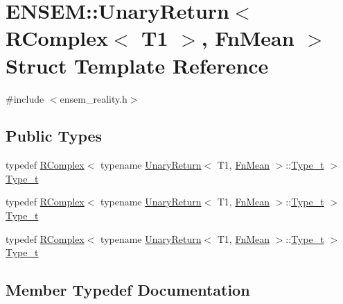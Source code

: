 \hypertarget{structENSEM_1_1UnaryReturn_3_01RComplex_3_01T1_01_4_00_01FnMean_01_4}{}\section{E\+N\+S\+EM\+:\+:Unary\+Return$<$ R\+Complex$<$ T1 $>$, Fn\+Mean $>$ Struct Template Reference}
\label{structENSEM_1_1UnaryReturn_3_01RComplex_3_01T1_01_4_00_01FnMean_01_4}


{\ttfamily \#include $<$ensem\+\_\+reality.\+h$>$}

\subsection*{Public Types}
\begin{DoxyCompactItemize}
\item 
typedef \mbox{\hyperlink{classENSEM_1_1RComplex}{R\+Complex}}$<$ typename \mbox{\hyperlink{structENSEM_1_1UnaryReturn}{Unary\+Return}}$<$ T1, \mbox{\hyperlink{structENSEM_1_1FnMean}{Fn\+Mean}} $>$\+::\mbox{\hyperlink{structENSEM_1_1UnaryReturn_3_01RComplex_3_01T1_01_4_00_01FnMean_01_4_a36f90d415b22308c1707a2639a538763}{Type\+\_\+t}} $>$ \mbox{\hyperlink{structENSEM_1_1UnaryReturn_3_01RComplex_3_01T1_01_4_00_01FnMean_01_4_a36f90d415b22308c1707a2639a538763}{Type\+\_\+t}}
\item 
typedef \mbox{\hyperlink{classENSEM_1_1RComplex}{R\+Complex}}$<$ typename \mbox{\hyperlink{structENSEM_1_1UnaryReturn}{Unary\+Return}}$<$ T1, \mbox{\hyperlink{structENSEM_1_1FnMean}{Fn\+Mean}} $>$\+::\mbox{\hyperlink{structENSEM_1_1UnaryReturn_3_01RComplex_3_01T1_01_4_00_01FnMean_01_4_a36f90d415b22308c1707a2639a538763}{Type\+\_\+t}} $>$ \mbox{\hyperlink{structENSEM_1_1UnaryReturn_3_01RComplex_3_01T1_01_4_00_01FnMean_01_4_a36f90d415b22308c1707a2639a538763}{Type\+\_\+t}}
\item 
typedef \mbox{\hyperlink{classENSEM_1_1RComplex}{R\+Complex}}$<$ typename \mbox{\hyperlink{structENSEM_1_1UnaryReturn}{Unary\+Return}}$<$ T1, \mbox{\hyperlink{structENSEM_1_1FnMean}{Fn\+Mean}} $>$\+::\mbox{\hyperlink{structENSEM_1_1UnaryReturn_3_01RComplex_3_01T1_01_4_00_01FnMean_01_4_a36f90d415b22308c1707a2639a538763}{Type\+\_\+t}} $>$ \mbox{\hyperlink{structENSEM_1_1UnaryReturn_3_01RComplex_3_01T1_01_4_00_01FnMean_01_4_a36f90d415b22308c1707a2639a538763}{Type\+\_\+t}}
\end{DoxyCompactItemize}


\subsection{Member Typedef Documentation}
\mbox{\label{structENSEM_1_1UnaryReturn_3_01RComplex_3_01T1_01_4_00_01FnMean_01_4_a36f90d415b22308c1707a2639a538763}} 
